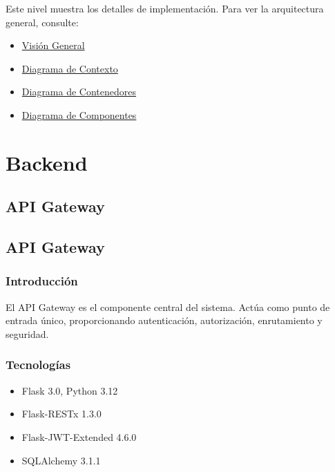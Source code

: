 \documentclass[
  spanish,
  11pt,
  letterpaper,
]{book}
\providecommand{\tightlist}{%
  \setlength{\itemsep}{0pt}\setlength{\parskip}{0pt}}
\begin{document}
Este nivel muestra los detalles de implementación. Para ver la
arquitectura general, consulte:

\begin{itemize}
\tightlist
\item
  \hyperref[visiuxf3n-general-de-la-arquitectura]{Visión General}
\item
  \hyperref[diagrama-de-contexto-c4---nivel-1]{Diagrama de Contexto}
\item
  \hyperref[diagrama-de-contenedores-c4---nivel-2]{Diagrama de
  Contenedores}
\item
  \hyperref[diagrama-de-componentes-c4---nivel-3]{Diagrama de
  Componentes}
\end{itemize}

\part{Backend}

\chapter{API Gateway}\label{api-gateway}

\chapter{API Gateway}\label{api-gateway-1}

\section{Introducción}\label{introducciuxf3n-5}

El API Gateway es el componente central del sistema. Actúa como punto de
entrada único, proporcionando autenticación, autorización, enrutamiento
y seguridad.

\section{Tecnologías}\label{tecnologuxedas}

\begin{itemize}
\tightlist
\item
  Flask 3.0, Python 3.12
\item
  Flask-RESTx 1.3.0
\item
  Flask-JWT-Extended 4.6.0
\item
  SQLAlchemy 3.1.1
\end{itemize}
\end{document}

